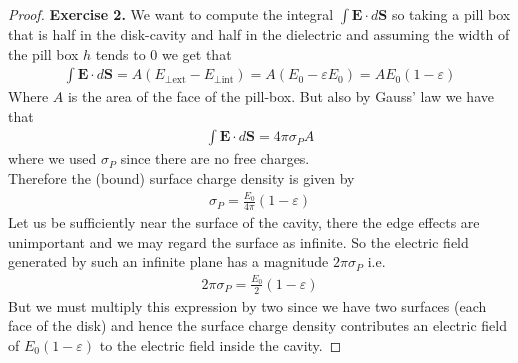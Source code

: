 \documentclass[11pt]{article}
\theoremstyle{definition}
\begin{document}
\cleardoublepage
\begin{proof}{\textbf{Exercise 2.}}
We want to compute the integral $\int \bm{E}\cdot d\bm{S}$ so taking a pill box
that is half in the disk-cavity and half in the dielectric and assuming the
width of the pill box $h$ tends to 0 we get that
\begin{align*}
    \int \bm{E}\cdot d\bm{S} = A(E_{\perp \text{ext}} - E_{\perp \text{int}})
    = A(E_0 - \varepsilon E_0)
    =AE_0(1 - \varepsilon)
\end{align*}
Where $A$ is the area of the face of the pill-box.
But also by Gauss' law we have that
\begin{align*}
    \int \bm{E}\cdot d\bm{S} = 4\pi\sigma_P A
\end{align*}
where we used $\sigma_P$ since there are no free charges.
\\
Therefore the (bound) surface charge density is given by
\begin{align*}
    \sigma_P = \frac{E_0}{4\pi}(1 - \varepsilon) 
\end{align*}
Let us be sufficiently near the surface of the cavity, there the edge effects
are unimportant and we may regard the surface as infinite. So the electric field
generated by such an infinite plane has a magnitude $2\pi \sigma_P$ i.e.
\begin{align*}
    2\pi\sigma_P = \frac{E_0}{2}(1 - \varepsilon)
\end{align*}
But we must multiply this expression by two since we have two surfaces (each
face of the disk) and hence the surface charge density contributes an
electric field of $E_0(1 - \varepsilon)$ to the electric field inside the
cavity.
\end{proof}
\end{document}
